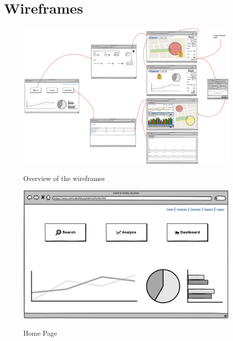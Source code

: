 \documentclass[../main.tex]{subfiles}
\begin{document}
    \chapter{Wireframes}\label{ch:wireframes}
    \begin{figure}[H]
        \centering
        \includegraphics[scale = 0.35]{assets/wireframes/wire_sum.png} \\
        \caption[]{Overview of the wireframes}\label{fig:figure5}
    \end{figure}
    \begin{figure}[H]
        \centering
        \includegraphics[scale = 0.32]{assets/wireframes/wire1.png} \\
        \caption[]{Home Page}\label{fig:figure6}
    \end{figure}
\end{document}
